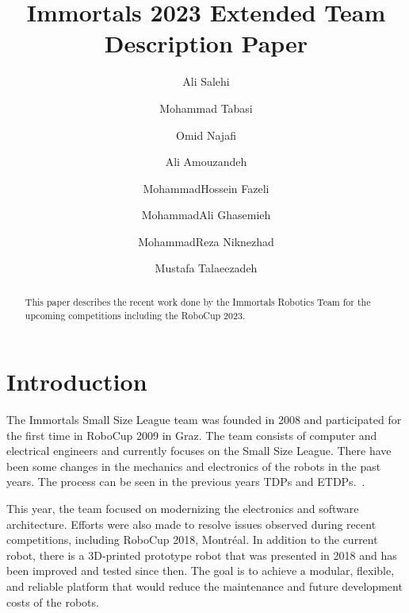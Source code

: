\documentclass[runningheads]{llncs}
\begin{document}
%
\title{Immortals 2023 Extended Team Description Paper}
%
%

\author{Ali Salehi \and
Mohammad Tabasi \and
Omid Najafi \and
Ali Amouzandeh \and
MohammadHossein Fazeli \and
MohammadAli Ghasemieh \and
MohammadReza Niknezhad \and
Mustafa Talaeezadeh}
%
%
%
\maketitle              %
%
\begin{abstract}
This paper describes the recent work done by the Immortals Robotics Team for the upcoming competitions including the RoboCup 2023.

\end{abstract}
%
%
%
\section{Introduction}
The Immortals Small Size League team was founded in 2008 and participated for the first time in RoboCup 2009 in Graz. The team consists of computer and electrical engineers and currently focuses on the Small Size League.
 There have been some changes in the mechanics and electronics of the robots in the past years. The process can be seen in the previous years TDPs and ETDPs.~\cite{ref_ETDP2019}.
 
 This year, the team focused on modernizing the electronics and software architecture. Efforts were also made to resolve issues observed during recent competitions, including RoboCup 2018, Montréal. In addition to the current robot, there is a 3D-printed prototype robot that was presented in 2018 and has been improved and tested since then. The goal is to achieve a modular, flexible, and reliable platform that would reduce the maintenance and future development costs of the robots.
\end{document}
